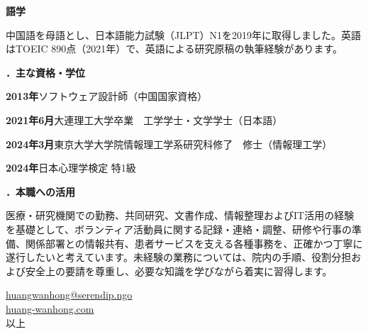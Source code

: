 \documentclass[10.5pt,a4paper]{article}
\newcommand{\MajorSection}[1]{%
  \par\vspace{0.85em}%
  {\minchofont\bfseries\fontsize{12.2pt}{15pt}\selectfont #1}\par
  \vspace{0.32em}%
}
\newcommand{\Institution}[1]{%
  \par\vspace{0.55em}%
  {\minchofont\bfseries\fontsize{11.2pt}{14pt}\selectfont #1}\par
  \vspace{0.1em}%
}
\begin{document}
\Institution{語学}
中国語を母語とし、日本語能力試験（JLPT）N1を2019年に取得しました。英語はTOEIC 890点（2021年）で、英語による研究原稿の執筆経験があります。

\MajorSection{5．主な資格・学位}

\noindent\textbf{2013年}\quad ソフトウェア設計師（中国国家資格）\par
\noindent\textbf{2021年6月}\quad 大連理工大学卒業　工学学士・文学学士（日本語）\par
\noindent\textbf{2024年3月}\quad 東京大学大学院情報理工学系研究科修了　修士（情報理工学）\par
\noindent\textbf{2024年}\quad 日本心理学検定 特1級\par

\MajorSection{6．本職への活用}
医療・研究機関での勤務、共同研究、文書作成、情報整理およびIT活用の経験を基礎として、ボランティア活動員に関する記録・連絡・調整、研修や行事の準備、関係部署との情報共有、患者サービスを支える各種事務を、正確かつ丁寧に遂行したいと考えています。未経験の業務については、院内の手順、役割分担および安全上の要請を尊重し、必要な知識を学びながら着実に習得します。

\vspace{0.8em}
\begin{flushright}
\href{mailto:huangwanhong@serendip.ngo}{huangwanhong@serendip.ngo}\\
\href{https://huang-wanhong.com}{huang-wanhong.com}\\[0.5em]
以上
\end{flushright}
\end{document}

